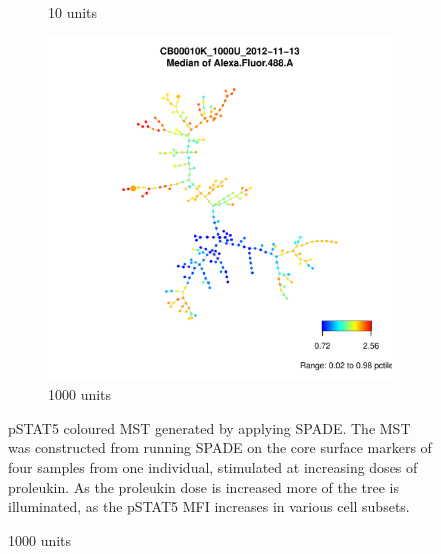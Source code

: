 \begin{figure}[h]
\begin{subfigure}[b]{.4\textwidth}
  \caption{10 units}
\end{subfigure}
\begin{subfigure}[b]{.4\textwidth}
  \includegraphics[scale=.4]{IL2/figures/CB00010K-1000U-2012-11-13-spade.pdf}
  \caption{1000 units}
\end{subfigure}
{pSTAT5 coloured \gls{MST} generated by applying \gls{SPADE}.}
{
  The \gls{MST} was constructed from running \gls{SPADE} on the core surface markers of four samples from one individual, stimulated at increasing doses of proleukin.
  As the proleukin dose is increased more of the tree is illuminated, as the pSTAT5 MFI increases in various cell subsets.
}
\end{figure}

